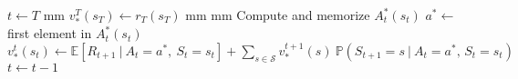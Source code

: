 \documentclass{standalone}
\begin{document}
	\begin{varwidth}{1.5\linewidth}
		\par\noindent
		\begin{algorithmic}[1]
			\State $t\gets T$
			 mm
				\State $\displaystyle v^{T}_*(s_{T}) \gets r_T(s_T)$
			\EndFor
			 mm
			 mm
			\State Compute and memorize $A^*_t(s_t)$
			\State $a^* \gets$ first element in $A^*_t(s_t)$
			\State $\displaystyle v^t_*(s_t) \gets \mathbb{E}\left[R_{t+1}\:|\:A_t=a^*, \: S_t=s_t  \right] + \sum_{s\in\mathcal{S}} v^{t+1}_*(s) \: \mathbb{P}(S_{t+1} = s\:|\: A_{t}=a^*, \, S_t = s_t)$
			\EndFor
			\State $t\gets t - 1$
			\EndWhile
			\EndProcedure
		\end{algorithmic}
	\end{varwidth}
\end{document}
